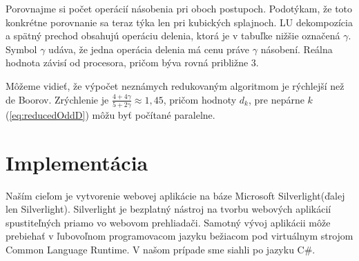 \documentclass{rnthesis}
\begin{document}
Porovnajme si počet operácií násobenia pri oboch postupoch. Podotýkam, že toto konkrétne porovnanie sa teraz týka len pri kubických splajnoch. LU dekompozícia a spätný prechod obsahujú operáciu delenia, ktorá je v tabuľke nižšie označená $\gamma$. Symbol $\gamma$ udáva, že jedna operácia delenia má cenu práve $\gamma$ násobení. Reálna hodnota závisí od procesora, pričom býva rovná približne 3.

Môžeme vidieť, že výpočet neznámych redukovaným algoritmom je rýchlejší než de Boorov.
Zrýchlenie je $\frac{4+4\gamma}{5+2\gamma} \approx 1{,}45$, pričom hodnoty $d_k$, pre nepárne $k$ (\ref{eq:reducedOddD}) môžu byť počítané paralelne.

\begin{table}[h] 
	\caption{Počet násobení s zrýchlenie pre K párne}
\end{table}


\section*{Implementácia}

Naším cieľom je vytvorenie webovej aplikácie na báze Microsoft Silverlight(ďalej len Silverlight). Silverlight je bezplatný nástroj na tvorbu webových aplikácií spustiteľných priamo vo webovom prehliadači. 
Samotný vývoj aplikácii môže prebiehať v ľubovoľnom programovacom jazyku bežiacom pod virtuálnym strojom Common Language Runtime. 
V našom prípade sme siahli po jazyku C\#. 
\end{document}
